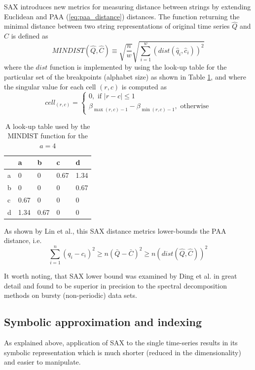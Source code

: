 \documentclass[conference]{IEEEtran}
\begin{document}
SAX introduces new metrics for measuring distance between strings by extending Euclidean and PAA (\ref{eq:paa_distance}) distances. 
The function returning the minimal distance between two string representations of original
 time series $\hat{Q}$ and $\hat{C}$ is defined as
\begin{equation}
MINDIST(\hat{Q},\hat{C}) \equiv \sqrt{ \frac{n}{w} } \sqrt{ \sum_{i=1}^{w} ( dist( \hat{q}_{i}, \hat{c}_{i} ) )^{2}}
\label{eq:sax_mindist}
\end{equation} 
where the $dist$ function is implemented by using the look-up table for the particular set of the breakpoints 
(alphabet size) as shown in Table \ref{tbl:sax_lookup}, and where the singular value for each cell $(r,c)$ 
is computed as 
\begin{equation}
cell_{(r,c)} = 
\begin{cases} 
0, \text{ if }\left| r-c \right| \leq 1 \\
\beta_{\max(r,c) - 1} - \beta_{\min(r,c) - 1}, \text{ otherwise}
\end{cases}
\label{eq:cell}
\end{equation}

\begin{table}
\begin{tabularx}{240pt}{X X X X X}
\hline
   & a   & b    & c    & d    \\
\hline
a & 0    & 0    & 0.67 & 1.34 \\
b & 0    & 0    & 0    & 0.67 \\
c & 0.67 & 0    & 0    & 0    \\
d & 1.34 & 0.67 & 0    & 0    \\
\hline
\end{tabularx}
\caption{A look-up table used by the MINDIST function for the $a=4$}
\label{tbl:sax_lookup}
\end{table}

As shown by Lin et al., this SAX distance metrics lower-bounds the PAA distance, i.e.
\begin{equation}
\sum_{i=1}^{n} (q_{i} - c_{i})^{2} \geq n(\bar{Q} - \bar{C})^{2} \geq n(dist(\hat{Q},\hat{C}))^2
\label{eq:sax_bounding}
\end{equation}

It worth noting, that SAX lower bound was examined by Ding et al. \cite{citeulike:4501572} in 
great detail and found to be superior in precision to the spectral decomposition methods 
on bursty (non-periodic) data sets.

\subsection{Symbolic approximation and indexing}
As explained above, application of SAX to the single time-series results in its symbolic 
representation which is much shorter (reduced in the dimensionality) and easier to manipulate. 
\end{document}
